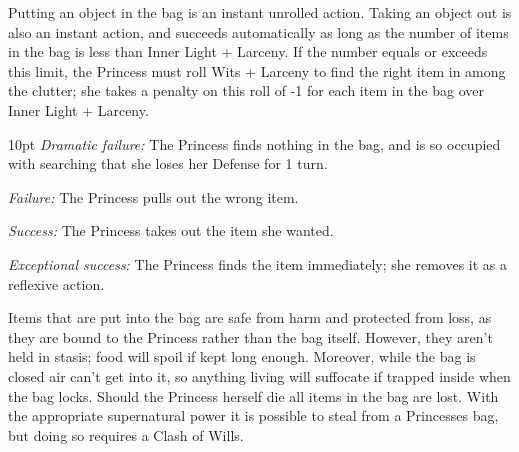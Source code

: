 Putting an object in the bag is an instant unrolled action. Taking an object out is also an instant action, and succeeds automatically as long as the number of items in the bag is less than Inner Light + Larceny. If the number equals or exceeds this limit, the Princess must roll Wits + Larceny to find the right item in among the clutter; she takes a penalty on this roll of -1 for each item in the bag over Inner Light + Larceny.

\begin{myindentpar}{10pt}    \emph{Dramatic failure:} The Princess finds nothing in the bag, and is so occupied with searching that she loses her Defense for 1 turn.

    \emph{Failure:} The Princess pulls out the wrong item.

    \emph{Success:} The Princess takes out the item she wanted.

    \emph{Exceptional success:} The Princess finds the item immediately; she removes it as a reflexive action.\end{myindentpar}

Items that are put into the bag are safe from harm and protected from loss, as they are bound to the Princess rather than the bag itself. However, they aren't held in stasis; food will spoil if kept long enough. Moreover, while the bag is closed air can't get into it, so anything living will suffocate if trapped inside when the bag locks. Should the Princess herself die all items in the bag are lost. With the appropriate supernatural power it is possible to steal from a Princesses bag, but doing so requires a Clash of Wills.

